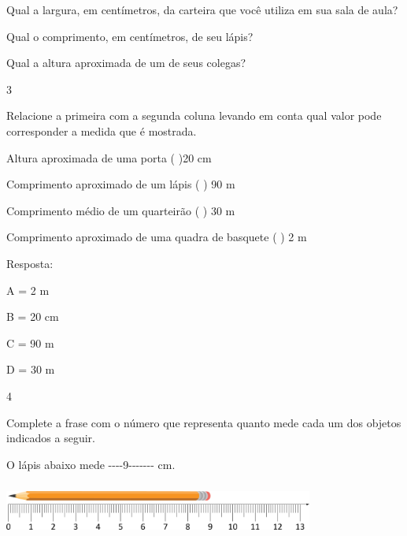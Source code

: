 \begin{escolha}
\begin{escolha}
\item
  Qual a largura, em centímetros, da carteira que você utiliza em sua
  sala de aula?

\item
  Qual o comprimento, em centímetros, de seu lápis?

\item
  Qual a altura aproximada de um de seus colegas?

\end{escolha}

\num{3}

Relacione a primeira com a segunda coluna levando em conta qual valor
pode corresponder a medida que é mostrada.

\begin{escolha}

\item
  Altura aproximada de uma porta ( )20 cm
\item
  Comprimento aproximado de um lápis ( ) 90 m
\item
  Comprimento médio de um quarteirão ( ) 30 m
\item
  Comprimento aproximado de uma quadra de basquete ( ) 2 m

\end{escolha}

Resposta:

A = 2 m

B = 20 cm

C = 90 m

D = 30 m


\num{4}

Complete a frase com o número que representa quanto mede cada um dos
objetos indicados a seguir.

\begin{escolha}

\item
  O lápis abaixo mede -\/-\/-\/-9-\/-\/-\/-\/-\/-\/- cm.

  \includegraphics[width=4.00868in,height=0.70839in]{media/image42.png}


\end{escolha}
\end{escolha}
